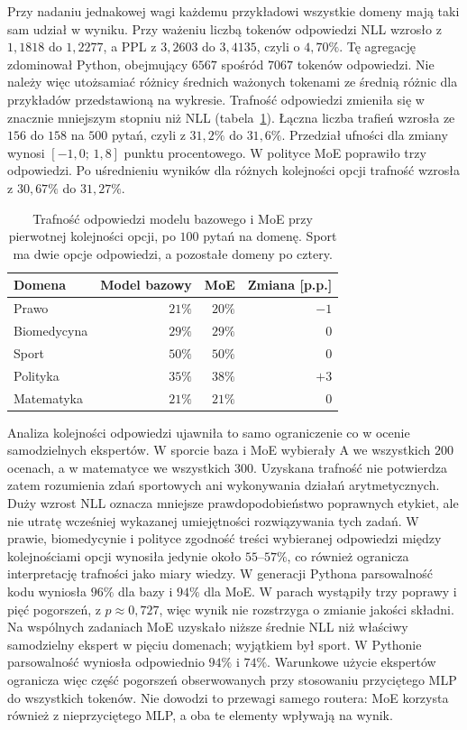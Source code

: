 Przy nadaniu jednakowej wagi każdemu przykładowi wszystkie domeny mają taki sam udział w wyniku. Przy ważeniu liczbą tokenów odpowiedzi NLL wzrosło z $1{,}1818$ do $1{,}2277$, a PPL z $3{,}2603$ do $3{,}4135$, czyli o $4{,}70\%$. Tę agregację zdominował Python, obejmujący $6567$ spośród $7067$ tokenów odpowiedzi. Nie należy więc utożsamiać różnicy średnich ważonych tokenami ze średnią różnic dla przykładów przedstawioną na wykresie. \newline
Trafność odpowiedzi zmieniła się w znacznie mniejszym stopniu niż NLL (tabela~\ref{tab:walidacja_mc}). Łączna liczba trafień wzrosła ze $156$ do $158$ na $500$ pytań, czyli z $31{,}2\%$ do $31{,}6\%$. Przedział ufności dla zmiany wynosi $[-1{,}0;\,1{,}8]$ punktu procentowego. W polityce MoE poprawiło trzy odpowiedzi. Po uśrednieniu wyników dla różnych kolejności opcji trafność wzrosła z $30{,}67\%$ do $31{,}27\%$.

\begin{table}[htbp]
\centering
\begin{tabular}{lrrr}
\toprule
Domena & Model bazowy & MoE & Zmiana [p.p.] \\
\midrule
Prawo & $21\%$ & $20\%$ & $-1$ \\
Biomedycyna & $29\%$ & $29\%$ & $0$ \\
Sport & $50\%$ & $50\%$ & $0$ \\
Polityka & $35\%$ & $38\%$ & $+3$ \\
Matematyka & $21\%$ & $21\%$ & $0$ \\
\bottomrule
\end{tabular}
\caption{Trafność odpowiedzi modelu bazowego i MoE przy pierwotnej kolejności opcji, po $100$ pytań na domenę. Sport ma dwie opcje odpowiedzi, a pozostałe domeny po cztery.}
\label{tab:walidacja_mc}
\end{table}

Analiza kolejności odpowiedzi ujawniła to samo ograniczenie co w ocenie samodzielnych ekspertów. W sporcie baza i MoE wybierały A we wszystkich $200$ ocenach, a w matematyce we wszystkich $300$. Uzyskana trafność nie potwierdza zatem rozumienia zdań sportowych ani wykonywania działań arytmetycznych. Duży wzrost NLL oznacza mniejsze prawdopodobieństwo poprawnych etykiet, ale nie utratę wcześniej wykazanej umiejętności rozwiązywania tych zadań. W prawie, biomedycynie i polityce zgodność treści wybieranej odpowiedzi między kolejnościami opcji wynosiła jedynie około $55$--$57\%$, co również ogranicza interpretację trafności jako miary wiedzy. \newline
W generacji Pythona parsowalność kodu wyniosła $96\%$ dla bazy i $94\%$ dla MoE. W parach wystąpiły trzy poprawy i pięć pogorszeń, z $p\approx0{,}727$, więc wynik nie rozstrzyga o zmianie jakości składni. \newline
Na wspólnych zadaniach MoE uzyskało niższe średnie NLL niż właściwy samodzielny ekspert w pięciu domenach; wyjątkiem był sport. W Pythonie parsowalność wyniosła odpowiednio $94\%$ i $74\%$. Warunkowe użycie ekspertów ogranicza więc część pogorszeń obserwowanych przy stosowaniu przyciętego MLP do wszystkich tokenów. Nie dowodzi to przewagi samego routera: MoE korzysta również z nieprzyciętego MLP, a oba te elementy wpływają na wynik.


